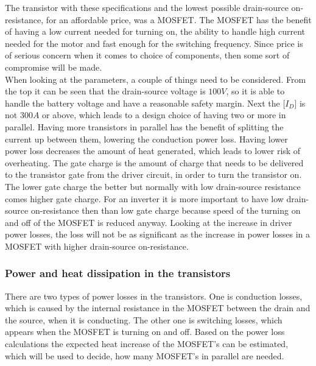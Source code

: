 The transistor with these specifications and the lowest possible drain-source on-resistance, for an affordable price, was a MOSFET. The MOSFET has the benefit of having a low current needed for turning on, the ability to handle high current needed for the motor and fast enough for the switching frequency. Since price is of serious concern when it comes to choice of components, then some sort of compromise will be made. \\



When looking at the parameters, a couple of things need to be considered. From the top it can be seen that the drain-source voltage is $100 V$, so it is able to handle the battery voltage and have a reasonable safety margin. 
Next the [$I_D$] is not $300 A$ or above, which leads to a design choice of having two or more in parallel. Having more transistors in parallel has the benefit of splitting the current up between them, lowering the conduction power loss. 
Having lower power loss decreases the amount of heat generated, which leads to lower risk of overheating. 
The gate charge is the amount of charge that needs to be delivered to the transistor gate from the driver circuit, in order to turn the transistor on. 
The lower gate charge the better but normally with low drain-source resistance comes higher gate charge.
For an inverter it is more important to have low drain-source on-resistance then than low gate charge because speed of the turning on and off of the MOSFET is reduced anyway. Looking at the increase in driver power losses, the loss will not be as significant as the increase in power losses in a MOSFET with higher drain-source on-resistance.\\ 


\subsubsection{Power and heat dissipation in the transistors}
There are two types of power losses in the transistors. One is conduction losses, which is caused by the internal resistance in the MOSFET between the drain and the source, when it is conducting. The other one is switching losses, which appears when the MOSFET is turning on and off. Based on the power loss calculations the expected heat increase of the MOSFET's can be estimated, which will be used to decide, how many MOSFET's in parallel are needed.


